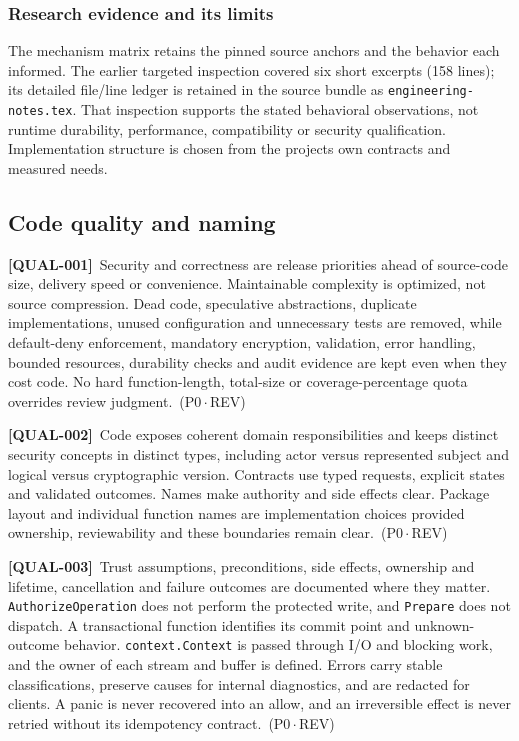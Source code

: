 \documentclass[11pt,a4paper]{article}
\newcommand{\code}[1]{{\small\nolinkurl{#1}}}
\newcommand{\reqtag}[2]{{\footnotesize\color{accent}(#1\,$\cdot$\,#2)}}
\newcommand{\req}[4]{\par\noindent\hypertarget{req:#1}{\textbf{[#1]}}\ #4\ \reqtag{#2}{#3}\par}
\begin{document}
\subsubsection{Research evidence and its limits}
The mechanism matrix retains the pinned source anchors and the behavior each informed. The earlier targeted inspection covered six short excerpts (158 lines); its detailed file/line ledger is retained in the source bundle as \texttt{engineering-notes.tex}. That inspection supports the stated behavioral observations, not runtime durability, performance, compatibility or security qualification. Implementation structure is chosen from the project\textquotesingle s own contracts and measured needs.

\subsection{Code quality and naming}
\req{QUAL-001}{P0}{REV}{Security and correctness are release priorities ahead of source-code size, delivery speed or convenience. Maintainable complexity is optimized, not source compression. Dead code, speculative abstractions, duplicate implementations, unused configuration and unnecessary tests are removed, while default-deny enforcement, mandatory encryption, validation, error handling, bounded resources, durability checks and audit evidence are kept even when they cost code. No hard function-length, total-size or coverage-percentage quota overrides review judgment.}
\req{QUAL-002}{P0}{REV}{Code exposes coherent domain responsibilities and keeps distinct security concepts in distinct types, including actor versus represented subject and logical versus cryptographic version. Contracts use typed requests, explicit states and validated outcomes. Names make authority and side effects clear. Package layout and individual function names are implementation choices provided ownership, reviewability and these boundaries remain clear.}
\req{QUAL-003}{P0}{REV}{Trust assumptions, preconditions, side effects, ownership and lifetime, cancellation and failure outcomes are documented where they matter. \code{AuthorizeOperation} does not perform the protected write, and \code{Prepare} does not dispatch. A transactional function identifies its commit point and unknown-outcome behavior. \code{context.Context} is passed through I/O and blocking work, and the owner of each stream and buffer is defined. Errors carry stable classifications, preserve causes for internal diagnostics, and are redacted for clients. A panic is never recovered into an allow, and an irreversible effect is never retried without its idempotency contract.}
\end{document}
